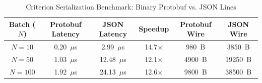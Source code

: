 \begin{table}[t]
\centering
\caption{Criterion Serialization Benchmark: Binary Protobuf vs. JSON Lines}
\label{tab:telemetry_serialization}
\begin{tabular}{cccccc}
\hline
\textbf{Batch ($N$)} & \textbf{Protobuf Latency} & \textbf{JSON Latency} & \textbf{Speedup} & \textbf{Protobuf Wire} & \textbf{JSON Wire} \\
\hline
$N = 10$ & 0.20~$\mu$s & 2.99~$\mu$s & 14.7$\times$ & 980~B & 3850~B \\
$N = 50$ & 1.03~$\mu$s & 12.48~$\mu$s & 12.1$\times$ & 4900~B & 19250~B \\
$N = 100$ & 1.92~$\mu$s & 24.13~$\mu$s & 12.6$\times$ & 9800~B & 38500~B \\
\hline
\end{tabular}
\end{table}
